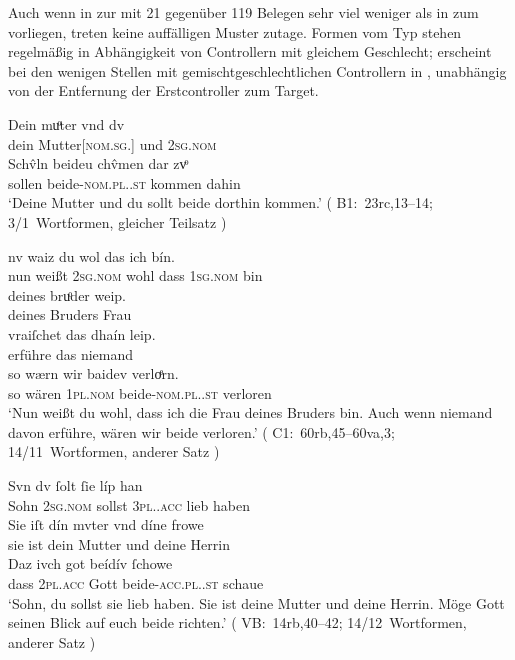 Auch wenn in  zur \KC{} mit 21 gegenüber 119 Belegen
sehr viel weniger als in  zum \CAO{} vorliegen,
treten keine auffälligen Muster zutage. Formen vom Typ  stehen
regelmäßig in Abhängigkeit von Controllern mit gleichem Geschlecht;
 erscheint bei den wenigen Stellen mit gemischtgeschlechtlichen
Controllern in , unabhängig von der Entfernung der
Erstcontroller zum Target.

\begin{exe}
\ex \label{ex:combgenddist1}
	\begin{xlist}
	\ex \label{ex:combgenddist_1} %
		\gll Dein muͦter vnd dv \\
			dein Mutter[\textsc{nom.sg.\FemF}] und \textsc{2sg\subM.nom} \\
	\sn	\gll Schv̂ln beideu chv̂men {dar zvͦ} \\
			sollen beide-\textsc{nom.pl.\NeutMF.st} kommen dahin \\
		\trans `Deine Mutter und du sollt beide dorthin kommen.'
			(%
				B1:~23rc,13--14;
				3/1~Wortformen, gleicher Teilsatz%
			)

	\ex \label{ex:combgenddist_2} %
		\gll nv waiz du wol das ich bín. \\
		     nun weißt \textsc{2sg\subM.nom} wohl dass \textsc{1sg\subF.nom} bin \\
	\sn \gll deines bruͦder weip. \\
	         deines Bruders Frau \\
	\sn \gll vraiſchet das {dhaín leip.} \\
		     erführe das niemand \\
	\sn \gll so wærn wir baidev verloͤrn. \\
		     so wären \textsc{1pl\subMF.nom} beide-\textsc{nom.pl.\NeutMF.st}
		     verloren \\
		\trans `Nun weißt du wohl, dass ich die Frau deines Bruders bin.
			Auch wenn niemand davon erführe, wären wir beide verloren.'
			(%
				C1:~60rb,45--60va,3;
				14/11~Wortformen, anderer Satz%
			)

	\ex \label{ex:combgenddist_3} %
		\gll Svn dv ſolt ſie líp han \\
		     Sohn \textsc{2sg\subM.nom} sollst \textsc{3pl.\FemF.acc} lieb haben \\
	\sn \gll Sie iſt dín mvter vnd díne frowe \\
		     sie ist dein Mutter und deine Herrin \\
	\sn \gll Daz ivch got beídív ſchowe \\
		     dass \textsc{2pl\subMF.acc} Gott beide-\textsc{acc.pl.\NeutMF.st} schaue \\
		\trans `Sohn, du sollst sie lieb haben. Sie ist deine Mutter und
			deine Herrin. Möge Gott seinen Blick auf euch beide richten.'
			(%
				VB:~14rb,40--42;
				14/12~Wortformen, anderer Satz%
			)
	\end{xlist}
\end{exe}

